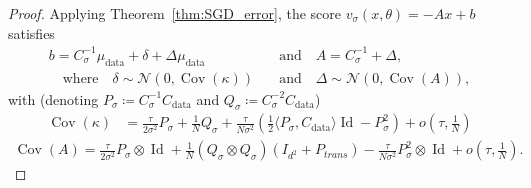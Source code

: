\documentclass[11pt]{article}
\newcommand{\eqdef}{\coloneqq}
\newcommand{\id}{\operatorname{Id}}
\newcommand{\cov}{\operatorname{Cov}}
\begin{document}
\begin{proof}
Applying Theorem~\ref{thm:SGD_error}, the score $v_\sigma(x, \theta) = -A x + b$ satisfies
\begin{equation*}
\begin{split}
    b = C_\sigma^{-1}\mu_\mathrm{data} + \delta + \Delta \mu_\mathrm{data} \quad &\text{and} \quad
    A = C_\sigma^{-1} + \Delta, \\ 
    \quad\text{where}\quad \delta \sim \mathcal{N}(0, \cov(\kappa)) \quad &\text{and}\quad \Delta \sim \mathcal{N}(0, \cov(A)),
\end{split}
\end{equation*}
with (denoting $P_\sigma \eqdef C_\sigma^{-1} C_\mathrm{data}$ and $Q_\sigma \eqdef C_\sigma^{-2}C_\mathrm{data}$)
\begin{equation*}
\begin{split}
\cov(\kappa) &= \frac{\tau}{2 \sigma^2} P_\sigma +  \frac{1}{N} Q_\sigma + \frac{\tau}{N \sigma^2} \left( \frac12 \langle P_\sigma, C_\mathrm{data} \rangle \id -  P_\sigma^2 \right) 
+ o \left(\tau, \frac{1}{N}\right) 
\end{split}
\end{equation*}
\begin{equation*}
\begin{split}
\cov(A)  = \frac{\tau}{2\sigma^2} P_\sigma \otimes \id + \frac{1}{N} \left( Q_\sigma \otimes Q_\sigma \right) (I_{d^2} + P_{trans})  -  \frac{\tau}{N \sigma^2} P_\sigma^2 \otimes \id  + o\left(\tau, \frac{1}{N}\right) .
\end{split}
\end{equation*}

\end{proof}
\end{document}
